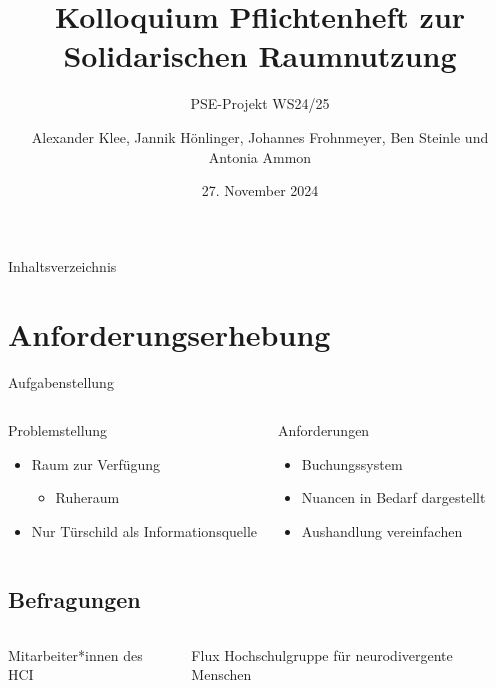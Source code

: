 \documentclass{sdqbeamer}
\title[Solidarische Raumnutzung Pflichtenheft]{Kolloquium Pflichtenheft zur Solidarischen Raumnutzung}
\subtitle{PSE-Projekt WS24/25}
\author[Soli-Gruppe]{Alexander Klee, Jannik Hönlinger, Johannes Frohnmeyer, Ben Steinle und Antonia Ammon}
\date[27.\,11.\,2024]{27. November 2024}
\begin{document}
 
\KITtitleframe

\begin{frame}{Inhaltsverzeichnis}
\tableofcontents
\end{frame}

\section{Anforderungserhebung}

\begin{frame}{Aufgabenstellung}
    \begin{columns}
        \begin{greenblock}{Problemstellung}
            \begin{itemize}
                \item Raum zur Verfügung
                \begin{itemize}
                    \item Ruheraum
                \end{itemize}
                \item Nur Türschild als Informationsquelle
    \end{itemize}
        \end{greenblock}
        \begin{greenblock}{Anforderungen}
            \begin{itemize}
                \item Buchungssystem
                \item Nuancen in Bedarf dargestellt
                \item Aushandlung vereinfachen
            \end{itemize}
        \end{greenblock}
    \end{columns}
\end{frame}

\subsection{Befragungen}
\begin{frame}{\insertsubsectionhead}
    \begin{columns}
        \begin{greenblock}{Mitarbeiter*innen}
        des HCI
        \end{greenblock}
        \begin{greenblock}{Flux}
        Hochschulgruppe für neurodivergente Menschen
        \end{greenblock}
    \end{columns}
\end{frame}
\end{document}
